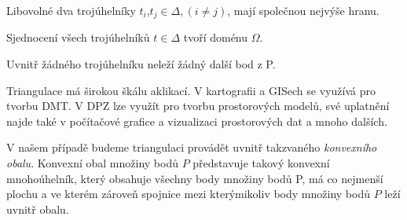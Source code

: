 \documentclass[12pt,a4paper]{article}
\begin{document}
Libovolné dva trojúhelníky $t_i$,$t_j \in \Delta, (i \neq j)$, mají společnou nejvýše hranu.

Sjednocení všech trojúhelníků $t \in \Delta$ tvoří doménu $\Omega$.

Uvnitř žádného trojúhelníku neleží žádný další bod z P.

\bigskip
Triangulace má širokou škálu aklikací. V kartografii a GISech se využívá pro tvorbu DMT. V DPZ lze využít pro tvorbu prostorových modelů, své uplatnění najde také v počítačové grafice a vizualizaci prostorových dat a mnoho dalších.

V našem případě budeme triangulaci provádět uvnitř takzvaného \emph{konvexního obalu}. Konvexní obal množiny bodů $P$ představuje takový konvexní mnohoúhelník, který obsahuje všechny body množiny bodů P, má co nejmenší plochu a ve kterém zároveň spojnice mezi kterýmikoliv body množiny bodů $P$ leží uvnitř obalu.

\newpage
\begin{figure}[h!]
\centering
\begin{floatrow}
\end{floatrow}
\end{figure}
\end{document}
